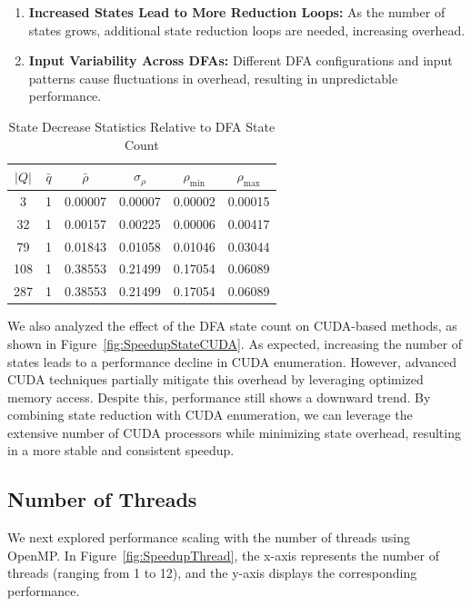\documentclass[sigconf]{acmart}
\newcommand{\minof}[1]{#1_{\text{min}}}
\newcommand{\maxof}[1]{#1_{\text{max}}}
\begin{document}
\begin{enumerate}
	\item \textbf{Increased States Lead to More Reduction Loops:} As the number of states grows, additional state reduction loops are needed, increasing overhead.
	\item \textbf{Input Variability Across DFAs:} Different DFA configurations and input patterns cause fluctuations in overhead, resulting in unpredictable performance.
\end{enumerate}

\begin{table}[t]
	\caption{State Decrease Statistics Relative to DFA State Count}
	\label{tab:StateReductionState}
	\begin{tabular}{cccccc}
		\toprule
		$|Q|$ & $\bar{q}$ & $\bar{\rho}$ & $\sigma_{\rho}$ & $\minof{\rho}$ & $\maxof{\rho}$ \\
		\midrule
		3     & 1         & 0.00007      & 0.00007         & 0.00002        & 0.00015        \\
		32    & 1         & 0.00157      & 0.00225         & 0.00006        & 0.00417        \\
		79    & 1         & 0.01843      & 0.01058         & 0.01046        & 0.03044        \\
		108   & 1         & 0.38553      & 0.21499         & 0.17054        & 0.06089        \\
		287   & 1         & 0.38553      & 0.21499         & 0.17054        & 0.06089        \\
		\bottomrule
	\end{tabular}
\end{table}

We also analyzed the effect of the DFA state count on CUDA-based methods, as shown in Figure~\ref{fig:SpeedupStateCUDA}. As expected, increasing the number of states leads to a performance decline in CUDA enumeration. However, advanced CUDA techniques partially mitigate this overhead by leveraging optimized memory access. Despite this, performance still shows a downward trend. By combining state reduction with CUDA enumeration, we can leverage the extensive number of CUDA processors while minimizing state overhead, resulting in a more stable and consistent speedup.

\subsection{Number of Threads}
We next explored performance scaling with the number of threads using OpenMP. In Figure~\ref{fig:SpeedupThread}, the x-axis represents the number of threads (ranging from 1 to 12), and the y-axis displays the corresponding performance.
\end{document}
